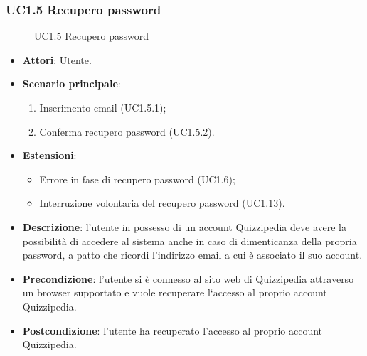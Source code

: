 \subsubsection{UC1.5 Recupero password}
\begin{figure}[H]
\centering
\noindent{}
\caption{UC1.5 Recupero password}
\end{figure}
\begin{itemize}
\item \textbf{Attori}: Utente.
\item \textbf{Scenario principale}:
\begin{enumerate}
\item Inserimento email (UC1.5.1);
\item Conferma recupero password (UC1.5.2).
\end{enumerate}
\item \textbf{Estensioni}:
\begin{itemize}
\item Errore in fase di recupero password (UC1.6);
\item Interruzione volontaria del recupero password (UC1.13).
\end{itemize}
\item \textbf{Descrizione}: l’utente in possesso di un account Quizzipedia deve avere la possibilità di accedere al sistema anche in caso di dimenticanza della propria password, a patto che ricordi l’indirizzo email a cui è associato il suo account.
\item \textbf{Precondizione}: l'utente si è connesso al sito web di Quizzipedia attraverso un browser supportato e vuole recuperare l‘accesso al proprio account Quizzipedia.
\item \textbf{Postcondizione}: l’utente ha recuperato l’accesso al proprio account Quizzipedia.
\end{itemize}
